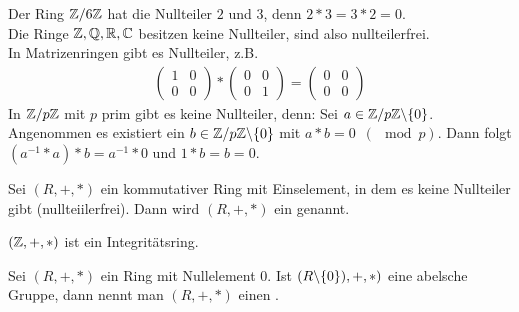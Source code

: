\begin{bsp}
	Der Ring $\mathbb{Z} / 6 \mathbb{Z}$ hat die Nullteiler $2$ und $3$, denn $2*3=3*2=0$. \\
	Die Ringe $\mathbb{Z}, \mathbb{Q}, \mathbb{R}, \mathbb{C}$ besitzen keine Nullteiler, sind also nullteilerfrei. \\
	In Matrizenringen gibt es Nullteiler, z.B.
	\begin{align*}
		\begin{pmatrix} 1 & 0 \\ 0 & 0 \end{pmatrix} * 
		\begin{pmatrix} 0 & 0 \\ 0 & 1 \end{pmatrix} =
		\begin{pmatrix} 0 & 0 \\ 0 & 0 \end{pmatrix}
	\end{align*}
	In $\mathbb{Z} / p \mathbb{Z}$ mit $p$ prim gibt es keine Nullteiler, denn: Sei $a \in \mathbb{Z} / p \mathbb{Z} \backslash \{ 0 \}$. Angenommen es existiert ein $b \in \mathbb{Z} / p \mathbb{Z} \backslash \{ 0 \}$ mit $a*b=0 \enspace (\mod p)$. Dann folgt $(a^{-1}*a)*b = a^{-1} * 0$ und $1*b=b=0$. \Lightning
\end{bsp}
%
\begin{defin}
	Sei $(R,+,*)$ ein kommutativer Ring mit Einselement, in dem es keine Nullteiler gibt (nullteiilerfrei). Dann wird $(R,+,*)$ ein  genannt.
\end{defin}
%
\begin{bsp}
	$(\mathbb{Z}, +,*)$ ist ein Integritätsring.
\end{bsp}
%
\begin{defin}
	Sei $(R,+,*)$ ein Ring mit Nullelement $0$. Ist $(R \backslash \{ 0 \}), +,*)$ eine abelsche Gruppe, dann nennt man $(R,+,*)$ einen .
\end{defin}
